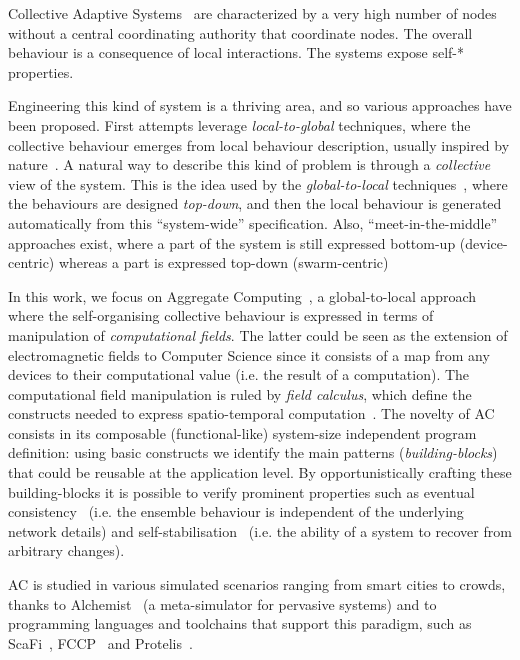 \documentclass[conference]{IEEEtran}
\begin{document}
Collective Adaptive Systems~\cite{DBLP:conf/huc/Ferscha15} are characterized by a very high number of nodes without a central coordinating authority that coordinate nodes. The overall behaviour is a consequence of local interactions. The systems expose self-* properties.
 
Engineering this kind of system is a thriving area, and so various approaches have been proposed.
 First attempts leverage \textit{local-to-global} techniques, where the collective behaviour emerges from local behaviour description, 
 usually inspired by nature~\cite{DBLP:journals/swarm/BrambillaFBD13}. 
%
 A natural way to describe this kind of problem is through a \textit{collective} view of the system.
 This is the idea used by the \textit{global-to-local} techniques~\cite{DBLP:journals/jlap/ViroliBDACP19,DBLP:journals/scp/AlrahmanNL20, DBLP:conf/cbse/BuresGHKKP13}, 
 where the behaviours are designed \textit{top-down}, and then the local behaviour is generated automatically from this ``system-wide'' specification. 
% 
Also, ``meet-in-the-middle''~\cite{DBLP:journals/computer/PinciroliB16} approaches exist, where
 a part of the system is still expressed bottom-up (device-centric) whereas a part is expressed top-down (swarm-centric)

In this work, we focus on Aggregate Computing~\cite{DBLP:journals/computer/BealPV15}, a global-to-local approach where
 the self-organising collective behaviour is expressed in terms of manipulation of \textit{computational fields}.
The latter could be seen as the extension of electromagnetic fields to Computer Science since it consists of a 
 map from any devices to their computational value (i.e. the result of a computation).
The computational field manipulation is ruled by \textit{field calculus}, which define the constructs needed 
 to express spatio-temporal computation~\cite{DBLP:conf/coordination/AudritoBDV18}.
The novelty of AC consists in its composable (functional-like) system-size independent program definition: 
using basic constructs we identify the main patterns (\textit{building-blocks}) that could be reusable at the application level.
By opportunistically crafting these building-blocks it is possible to verify prominent properties such as eventual consistency~\cite{DBLP:journals/taas/BealVPD17} 
 (i.e. the ensemble behaviour is independent of the underlying network details)
 and self-stabilisation~\cite{DBLP:journals/tomacs/ViroliABDP18} (i.e. the ability of a system to recover from arbitrary changes).

AC is studied in various simulated scenarios ranging from smart cities to crowds, 
 thanks to Alchemist~\cite{DBLP:journals/jos/PianiniMV13} (a meta-simulator for pervasive systems) and to programming languages and toolchains that support 
 this paradigm, such as ScaFi~\cite{DBLP:conf/ecoop/CasadeiV16}, FCCP~\cite{DBLP:conf/acsos/Audrito20} and Protelis~\cite{PianiniSAC2015}.
\end{document}
